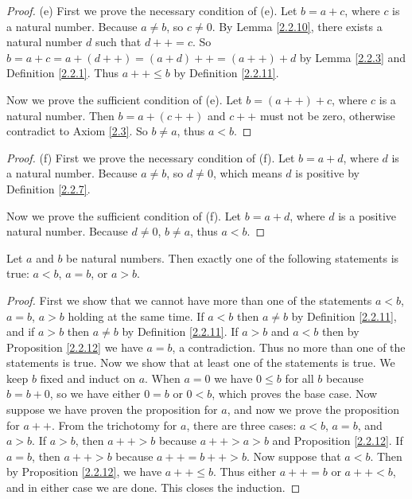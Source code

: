 \begin{proof}{(e)}
First we prove the necessary condition of (e).
Let \(b = a + c\), where \(c\) is a natural number.
Because \(a \neq b\), so \(c \neq 0\).
By Lemma \ref{2.2.10}, there exists a natural number \(d\) such that \(d++ = c\).
So \(b = a + c = a + (d++) = (a + d)++ = (a++) + d\) by Lemma \ref{2.2.3} and Definition \ref{2.2.1}.
Thus \(a++ \leq b\) by Definition \ref{2.2.11}.

Now we prove the sufficient condition of (e).
Let \(b = (a++) + c\), where \(c\) is a natural number.
Then \(b = a + (c++)\) and \(c++\) must not be zero, otherwise contradict to Axiom \ref{2.3}.
So \(b \neq a\), thus \(a < b\).
\end{proof}

\begin{proof}{(f)}
First we prove the necessary condition of (f).
Let \(b = a + d\), where \(d\) is a natural number.
Because \(a \neq b\), so \(d \neq 0\), which means \(d\) is positive by Definition \ref{2.2.7}.

Now we prove the sufficient condition of (f).
Let \(b = a + d\), where \(d\) is a positive natural number.
Because \(d \neq 0\), \(b \neq a\), thus \(a < b\).
\end{proof}

\begin{proposition}\label{2.2.13}
Let \(a\) and \(b\) be natural numbers.
Then exactly one of the following statements is true: \(a < b\), \(a = b\), or \(a > b\).
\end{proposition}

\begin{proof}
First we show that we cannot have more than one of the statements \(a < b\), \(a = b\), \(a > b\) holding at the same time.
If \(a < b\) then \(a \neq b\) by Definition \ref{2.2.11}, and if \(a > b\) then \(a \neq b\) by Definition \ref{2.2.11}.
If \(a > b\) and \(a < b\) then by Proposition \ref{2.2.12} we have \(a = b\), a contradiction.
Thus no more than one of the statements is true.
Now we show that at least one of the statements is true.
We keep \(b\) fixed and induct on \(a\).
When \(a = 0\) we have \(0 \leq b\) for all \(b\) because \(b = b + 0\), so we have either \(0 = b\) or \(0 < b\), which proves the base case.
Now suppose we have proven the proposition for \(a\), and now we prove the proposition for \(a++\).
From the trichotomy for \(a\), there are three cases: \(a < b\), \(a = b\), and \(a > b\).
If \(a > b\), then \(a++ > b\) because \(a++ > a > b\) and Proposition \ref{2.2.12}.
If \(a = b\), then \(a++ > b\) because \(a++ = b++ > b\).
Now suppose that \(a < b\).
Then by Proposition \ref{2.2.12}, we have \(a++ \leq b\).
Thus either \(a++ = b\) or \(a++ < b\), and in either case we are done.
This closes the induction.
\end{proof}

